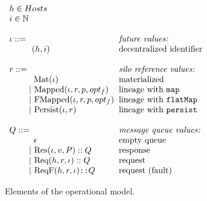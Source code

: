 \documentclass{article}
\theoremstyle{definition}
\newcommand{\gap}{\quad\quad}
\newcommand{\ba}{\begin{array}}
\newcommand{\ea}{\end{array}}
\newcommand{\Req}[3]{\text{Req}(#1, #2, #3)}
\newcommand{\Res}[3]{\text{Res}(#1, #2, #3)}
\begin{document}
\begin{figure}[ht!]
\centering

$\ba[t]{l@{\hspace{2mm}}l}
h \in Hosts                                         & \\   
i \in \mathbb{N}                                    & \\   
                                                    & \\   
\iota  ::=                                          & \mbox{{\it{future values:}}} \\
\gap \:\:\: (h, i)                                  & \mbox{decentralized identifier} \\   
                                                    & \\   
r ::=                                               & \mbox{{\it{silo reference values:}}} \\
\gap \:\:\:\: \text{Mat}(\iota)                     & \mbox{materialized} \\    
\gap ~|~  \text{Mapped}(\iota, r, p, opt_f)         & \mbox{lineage with \texttt{map}} \\    
\gap ~|~  \text{FMapped}(\iota, r, p, opt_f)        & \mbox{lineage with \texttt{flatMap}} \\   
\gap ~|~  \text{Persist}(\iota, r)                  & \mbox{lineage with \texttt{persist}} \\
                                                    & \\   
Q      ::=                                          & \mbox{{\it{message queue values:}}} \\
\gap \:\:\:\: \epsilon                              & \mbox{empty queue} \\
\gap ~|~    {\Res \iota v P} :: Q                     & \mbox{response} \\
\gap ~|~    {\Req h r \iota} :: Q                   & \mbox{request}  \\
\gap ~|~    \text{ReqF}(h, r, \iota) \texttt{::} Q  & \mbox{request (fault)} \\
\ea$

\caption{Elements of the operational model.}
\label{fig:elems-opsem}

\end{figure}
\end{document}
